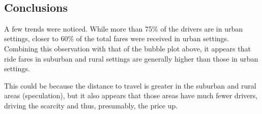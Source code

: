 \documentclass[11pt]{article}
\begin{document}
    \begin{center}
    \end{center}
    { \hspace*{\fill} \\}
    
    \hypertarget{conclusions}{%
\subsection{Conclusions}\label{conclusions}}

A few trends were noticed. While more than 75\% of the drivers are in
urban settings, closer to 60\% of the total fares were received in urban
settings. Combining this observation with that of the bubble plot above,
it appears that ride fares in suburban and rural settings are generally
higher than those in urban settings.

This could be because the distance to travel is greater in the suburban
and rural areas (speculation), but it also appears that those areas have
much fewer drivers, driving the scarcity and thus, presumably, the price
up.


    
    
    
    
\end{document}

